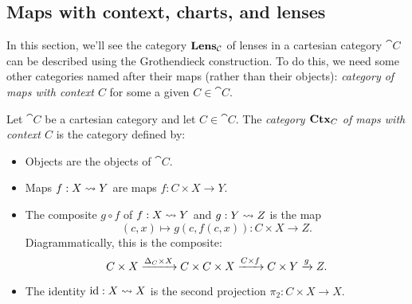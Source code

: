 \documentclass[DynamicalBook]{subfiles}
\begin{document}
\subsection{Maps with context, charts, and lenses}\label{sec.context_indexed_cat}

In this section, we'll see the category $\textbf{Lens}_{\mathcal{C}}$ of lenses in a
cartesian category $\cat{C}$ can be described using
the Grothendieck construction. To do this, we need some other categories named
after their maps (rather than their objects): 
\emph{category of maps with context $C$} for some a given $C \in \cat{C}$. 

\begin{definition}
  Let $\cat{C}$ be a cartesian category and let $C \in \cat{C}$. The
  \emph{category $\textbf{Ctx}_{C}$ of maps with context $C$}
  is the category defined by:
  \begin{itemize}
    \item Objects are the objects of $\cat{C}$.
    \item Maps $f : X \rightsquigarrow Y$ are maps $f : C \times X \to Y$.
    \item The composite $g \circ f$ of $f : X \rightsquigarrow Y$ and $g : Y \rightsquigarrow Z$ is
      the map
       $$(c, x) \mapsto g(c, f(c, x)) : C \times X \to Z.$$
       Diagrammatically, this is the composite:
       $$C \times X \xrightarrow{\Delta_C \times X} C \times C \times X \xrightarrow{C \times f}
       C \times Y \xrightarrow{g} Z.$$
    \item The identity $\mathrm{id} : X \rightsquigarrow X$ is the second projection $\pi_2 : C
      \times X \to X$.
  \end{itemize}
\end{definition}
\end{document}
